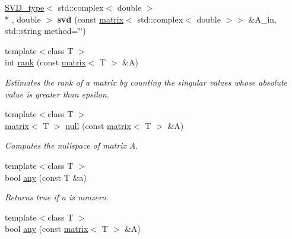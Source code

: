 \begin{DoxyCompactItemize}
\item 
\hypertarget{namespacekeycpp_ab96149e6d3b76c5363601903c4fb72bb}{\hyperlink{classkeycpp_1_1_s_v_d__type}{S\-V\-D\-\_\-type}$<$ std\-::complex$<$ double $>$\\*
, double $>$ {\bfseries svd} (const \hyperlink{classkeycpp_1_1matrix}{matrix}$<$ std\-::complex$<$ double $>$$>$ \&A\-\_\-in, std\-::string method=\char`\"{}\char`\"{})}\label{namespacekeycpp_ab96149e6d3b76c5363601903c4fb72bb}

\item 
\hypertarget{namespacekeycpp_aeb9efbc77cc58fa22403ea7ae5f4555c}{{\footnotesize template$<$class T $>$ }\\int \hyperlink{namespacekeycpp_aeb9efbc77cc58fa22403ea7ae5f4555c}{rank} (const \hyperlink{classkeycpp_1_1matrix}{matrix}$<$ T $>$ \&A)}\label{namespacekeycpp_aeb9efbc77cc58fa22403ea7ae5f4555c}

\begin{DoxyCompactList}\small\item\em Estimates the rank of a matrix by counting the singular values whose absolute value is greater than epsilon. \end{DoxyCompactList}\item 
\hypertarget{namespacekeycpp_a8f497e2da901adba0e1257be943595a1}{{\footnotesize template$<$class T $>$ }\\\hyperlink{classkeycpp_1_1matrix}{matrix}$<$ T $>$ \hyperlink{namespacekeycpp_a8f497e2da901adba0e1257be943595a1}{null} (const \hyperlink{classkeycpp_1_1matrix}{matrix}$<$ T $>$ \&A)}\label{namespacekeycpp_a8f497e2da901adba0e1257be943595a1}

\begin{DoxyCompactList}\small\item\em Computes the nullspace of matrix A. \end{DoxyCompactList}\item 
\hypertarget{namespacekeycpp_a70b89ab3e8f66f86c47c3bde004d4487}{{\footnotesize template$<$class T $>$ }\\bool \hyperlink{namespacekeycpp_a70b89ab3e8f66f86c47c3bde004d4487}{any} (const T \&a)}\label{namespacekeycpp_a70b89ab3e8f66f86c47c3bde004d4487}

\begin{DoxyCompactList}\small\item\em Returns true if a is nonzero. \end{DoxyCompactList}\item 
\hypertarget{namespacekeycpp_ade6d308fd22d34ad4860e5fcd22ccb39}{{\footnotesize template$<$class T $>$ }\\bool \hyperlink{namespacekeycpp_ade6d308fd22d34ad4860e5fcd22ccb39}{any} (const \hyperlink{classkeycpp_1_1matrix}{matrix}$<$ T $>$ \&A)}\label{namespacekeycpp_ade6d308fd22d34ad4860e5fcd22ccb39}


\end{DoxyCompactItemize}
